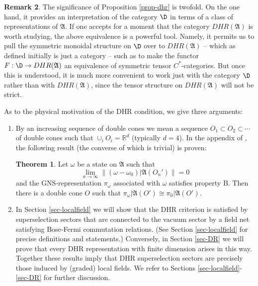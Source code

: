 \documentclass[12pt]{article}
\newcommand{\alg}[1]{\mathfrak{#1}}
\theoremstyle{definition}
\newtheorem{thm}{Theorem}[section]
\theoremstyle{definition}
\newtheorem{note}[thm]{Remark}
\theoremstyle{remark}
\def\7#1{{\mathbb #1}}
\begin{document}
\begin{note} \label{note-dhr} The significance of Proposition
  \ref{prop-dhr} is twofold. On the one hand, it provides an
  interpretation of the category $\D$ in terms of a class of
  representations of $\alg{A}$. If one accepts for a moment that the
  category $DHR(\alg{A})$ is worth studying, the above equivalence is
  a powerful tool. Namely, it permits us to pull the symmetric
  monoidal structure on $\D$ over to $DHR(\alg{A})$ -- which as
  defined initially is just a category -- such as to make the functor
  $F:\D\to DHR(\alg{A})$ an equivalence of symmetric tensor
  $C^*$-categories.  But once this is understood, it is much more
  convenient to work just with the category $\D$ rather than with
  $DHR(\alg{A})$, since the tensor structure on $DHR(\alg{A})$ will
  not be strict.

  As to the physical motivation of the DHR condition,
  we give three arguments:

\begin{enumerate}
\item By an increasing sequence of double cones we mean
  a sequence $O_1\subset O_2\subset \cdots $ of double
  cones such that $\cup_i O_i=\7R^d$ (typically
  $d=4$). In the appendix of \cite{dhr3}, the following
  result (the converse of which is trivial) is proven:

\begin{thm}
Let $\omega$ be a state on $\alg{A}$ such that 
\[ \lim_{n\to\infty}\|(\omega-\omega_0)|\alg{A}(O_n')\|=0 \]
and the GNS-representation $\pi_\omega$ associated with $\omega$ satisfies property B. Then there is
a double cone $O$ such that $\pi_\omega|\alg{A}(O')\cong\pi_0|\alg{A}(O')$.
\end{thm}

\item In Section \ref{sec-localfield} we will show that
  the DHR criterion is satisfied by superselection
  sectors that are connected to the vacuum sector by a
  field net satisfying Bose-Fermi commutation
  relations. (See Section \ref{sec-localfield} for
  precise definitions and statements.)  Conversely, in
  Section \ref{sec-DR} we will prove that every DHR
  representation with finite dimension arises in this
  way. Together these results imply that DHR
  superselection sectors are precisely those induced by
  (graded) local fields. We refer to Sections
  \ref{sec-localfield}-\ref{sec-DR} for further
  discussion.


\end{enumerate}
\end{note}
\end{document}
